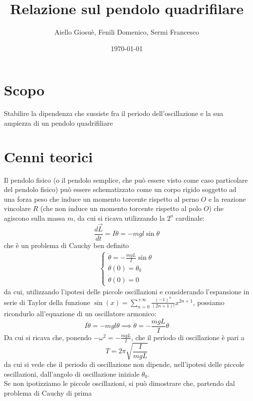 \documentclass{article}
\title{Relazione sul pendolo quadrifilare}
\author{Aiello Giosuè, Fenili Domenico, Sermi Francesco}
\date{\today}
\begin{document}
	\maketitle
	\newpage
	\tableofcontents
	\newpage
	\section{Scopo}
		Stabilire la dipendenza che sussiste fra il periodo dell'oscillazione e la sua ampiezza di un pendolo quadrifiliare
	\section{Cenni teorici}
	Il pendolo fisico (o il pendolo semplice, che può essere visto come caso particolare del pendolo fisico) può essere schematizzato come un corpo rigido soggetto ad una forza peso che induce un momento torcente rispetto al perno $O$ e la reazione vincolare $R$ (che non induce un momento torcente rispetto al polo $O$) che agiscono sulla massa $m$, da cui si ricava utilizzando la $2^a$ cardinale:
	\begin{equation}
		\frac{d\vec{L}}{dt} = I\ddot{\theta} = -mgl\sin{\theta}
	\end{equation}
	che è un problema di Cauchy ben definito
	\begin{align}
		\begin{cases*}
			\ddot{\theta} = - \frac{mgL}{I} \sin{\theta} \\
			\theta(0) = \theta_0 \\
			\dot{\theta}(0) = 0
		\end{cases*}
	\end{align}
	da cui, utilizzando l'ipotesi delle piccole oscillazioni e considerando l'espansione in serie di Taylor della funzione $\sin{(x)} = \sum\limits_{n=0}^{+\infty} \frac{(-1)^n}{(2n+1)!} x^{2n+1}$, possiamo ricondurlo all'equazione di un oscillatore armonico:
	\begin{equation}
		I\ddot{\theta} = -mgl\theta \implies \ddot\theta = -\frac{mgL}{I}\theta
	\end{equation}
	Da cui si ricava che, ponendo $-\omega^2 = -\frac{mgL}{I}$, che il periodo di oscillazione è pari a
	\begin{equation}
		T = 2\pi \sqrt{\frac{I}{mgL}}
	\end{equation}
	da cui si vede che il periodo di oscillazione non dipende, nell'ipotesi delle piccole oscillazioni, dall'angolo di oscillazione iniziale $\theta_0$. \\	
	Se non ipotizziamo le piccole oscillazioni, si può dimostrare che, partendo dal problema di Cauchy di prima
\end{document}
